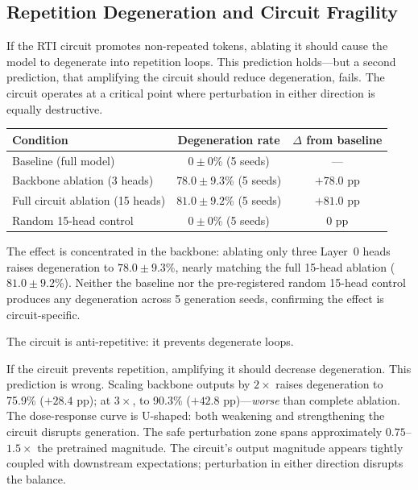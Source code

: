 \documentclass{article}
\begin{document}
\begin{appendices}

\section{Repetition Degeneration and Circuit Fragility}
\label{app:fragility}

If the RTI circuit promotes non-repeated tokens, ablating it should
cause the model to degenerate into repetition loops. This prediction
holds---but a second prediction, that amplifying the circuit should
reduce degeneration, fails. The circuit operates at a critical
point where perturbation in either direction is equally destructive.

\begin{center}
\begin{tabular}{lcc}
\toprule
\textbf{Condition} & \textbf{Degeneration rate} & \textbf{$\Delta$ from baseline} \\
\midrule
Baseline (full model) & $0 \pm 0$\% (5 seeds) & --- \\
Backbone ablation (3 heads) & $78.0 \pm 9.3$\% (5 seeds) & $+78.0$ pp \\
Full circuit ablation (15 heads) & $81.0 \pm 9.2$\% (5 seeds) & $+81.0$ pp \\
Random 15-head control & $0 \pm 0$\% (5 seeds) & $0$ pp \\
\bottomrule
\end{tabular}
\end{center}

The effect is concentrated in the backbone: ablating only three Layer~0
heads raises degeneration to $78.0 \pm 9.3$\%, nearly matching the full
15-head ablation ($81.0 \pm 9.2$\%). Neither the baseline nor the
pre-registered random 15-head control produces any degeneration across
5 generation seeds, confirming the effect is circuit-specific.

The circuit is anti-repetitive: it prevents degenerate loops.

If the circuit prevents repetition, amplifying it should decrease
degeneration. This prediction is wrong. Scaling backbone outputs by
$2\times$ raises degeneration to 75.9\% ($+28.4$ pp); at $3\times$,
to 90.3\% ($+42.8$ pp)---\emph{worse} than complete ablation. The
dose-response curve is U-shaped: both weakening and strengthening the
circuit disrupts generation. The safe perturbation zone spans
approximately $0.75$--$1.5\times$ the pretrained magnitude. The
circuit's output magnitude appears tightly coupled with downstream
expectations; perturbation in either direction disrupts the balance.


\end{appendices}
\end{document}
